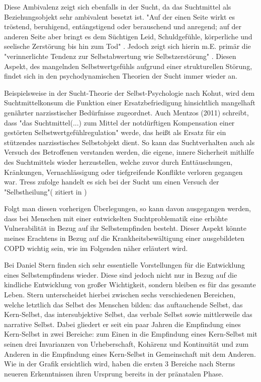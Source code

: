Diese Ambivalenz zeigt sich ebenfalls in der Sucht, da das Suchtmittel als Beziehungsobjekt sehr ambivalent besetzt ist. "Auf der einen Seite wirkt es tröstend, beruhigend, entängstigend oder berauschend und anregend; auf der anderen Seite aber bringt es dem Süchtigen Leid, Schuldgefühle, körperliche und seelische Zerstörung bis hin zum Tod" \autocite[175]{mentzos2011}. Jedoch zeigt sich hierin m.E. primär die "verinnerlichte Tendenz zur Selbstabwertung wie Selbstzerstörung" \autocite[10]{weidlinger2012}. Diesen Aspekt, des mangelnden Selbstwertgefühls aufgrund einer strukturellen Störung, findet sich in den psychodynamischen Theorien der Sucht immer wieder an. 

Beispielsweise in der Sucht-Theorie der Selbst-Psychologie nach Kohut, wird dem Suchtmittelkonsum die Funktion einer Ersatzbefriedigung hinsichtlich mangelhaft genährter narzisstischer Bedürfnisse zugeordnet. Auch Mentzos (2011) schreibt, dass "das Suchtmittel(...) zum Mittel der notdürftigen Kompensation einer gestörten Selbstwertgefühlregulation" werde, das heißt als Ersatz für ein stützendes narzisstisches Selbstobjekt dient. So kann das Suchtverhalten auch als Versuch des Betroffenen verstanden werden, die eigene, innere Sicherheit mithilfe des Suchtmittels wieder herzustellen, welche zuvor durch Enttäuschungen, Kränkungen, Vernachlässigung oder tiefgreifende Konflikte verloren gegangen war. Tress zufolge handelt es sich bei der Sucht um einen Versuch der "Selbstheilung"(\cite{tress1985} zitiert in \cite[222]{ermann1999})

Folgt man diesen vorherigen Überlegungen, so kann davon ausgegangen werden, dass bei Menschen mit einer entwickelten Suchtproblematik eine erhöhte Vulnerabilität in Bezug auf ihr Selbstempfinden besteht. Dieser Aspekt könnte meines Erachtens in Bezug auf die Krankheitsbewältigung einer ausgebildeten COPD wichtig sein, wie im Folgenden näher erläutert wird.

Bei Daniel Stern finden sich sehr essentielle Vorstellungen für die Entwicklung eines Selbstempfindens wieder. Diese sind jedoch nicht nur in Bezug auf die kindliche Entwicklung von großer Wichtigkeit, sondern bleiben es für das gesamte Leben. Stern unterscheidet hierbei zwischen sechs verschiedenen Bereichen, welche letztlich das Selbst des Menschen bilden: das auftauchende Selbst, das Kern-Selbst, das intersubjektive Selbst, das verbale Selbst sowie mittlerweile das narrative Selbst. Dabei gliedert er seit ein paar Jahren die Empfindung eines Kern-Selbst in zwei Bereiche: zum Einen in die Empfindung eines Kern-Selbst mit seinen drei Invarianzen von Urheberschaft, Kohärenz und Kontinuität und zum Anderen in die Empfindung eines Kern-Selbst in Gemeinschaft mit dem Anderen.  Wie in der Grafik ersichtlich wird, haben die ersten 3 Bereiche nach Sterns neueren Erkenntnissen ihren Ursprung bereits in der pränatalen Phase.



